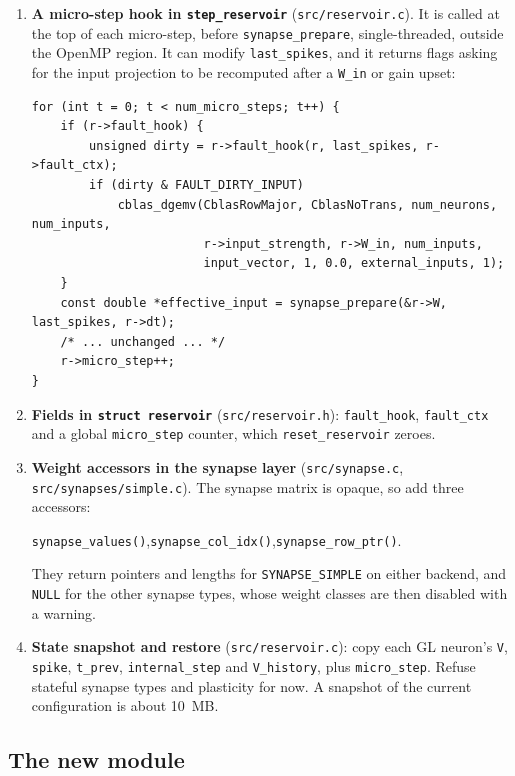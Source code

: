\documentclass[11pt,a4paper]{article}
\begin{document}
\begin{enumerate}
  \item \textbf{A micro-step hook in \texttt{step\_reservoir}} (\texttt{src/reservoir.c}). It is called at the top of each micro-step, before \texttt{synapse\_prepare}, single-threaded, outside the OpenMP region. It can modify \texttt{last\_spikes}, and it returns flags asking for the input projection to be recomputed after a \texttt{W\_in} or gain upset:
\begin{lstlisting}
for (int t = 0; t < num_micro_steps; t++) {
    if (r->fault_hook) {
        unsigned dirty = r->fault_hook(r, last_spikes, r->fault_ctx);
        if (dirty & FAULT_DIRTY_INPUT)
            cblas_dgemv(CblasRowMajor, CblasNoTrans, num_neurons, num_inputs,
                        r->input_strength, r->W_in, num_inputs,
                        input_vector, 1, 0.0, external_inputs, 1);
    }
    const double *effective_input = synapse_prepare(&r->W, last_spikes, r->dt);
    /* ... unchanged ... */
    r->micro_step++;
}
\end{lstlisting}
  \item \textbf{Fields in \texttt{struct reservoir}} (\texttt{src/reservoir.h}): \texttt{fault\_hook}, \texttt{fault\_ctx} and a global \texttt{micro\_step} counter, which \texttt{reset\_reservoir} zeroes.
  \item \textbf{Weight accessors in the synapse layer} (\texttt{src/synapse.c}, \texttt{src/synapses/simple.c}). The synapse matrix is opaque, so add three accessors:
  \begin{center}\texttt{synapse\_values()},\quad \texttt{synapse\_col\_idx()},\quad \texttt{synapse\_row\_ptr()}.\end{center}
  They return pointers and lengths for \texttt{SYNAPSE\_SIMPLE} on either backend, and \texttt{NULL} for the other synapse types, whose weight classes are then disabled with a warning.
  \item \textbf{State snapshot and restore} (\texttt{src/reservoir.c}): copy each GL neuron's \texttt{V}, \texttt{spike}, \texttt{t\_prev}, \texttt{internal\_step} and \texttt{V\_history}, plus \texttt{micro\_step}. Refuse stateful synapse types and plasticity for now. A snapshot of the current configuration is about 10~MB.
\end{enumerate}

\subsection{The new module}
\end{document}
